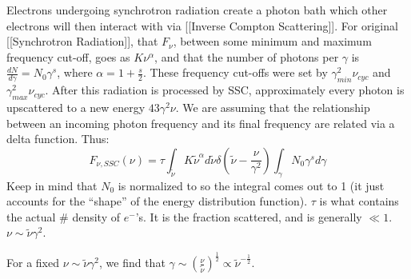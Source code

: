 \documentclass{article}
\def\hf{\frac12}
\def\hf{\frac12}
\def\tn{{\tilde\nu}}
\begin{document}
Electrons undergoing synchrotron radiation create a photon bath which
other electrons will then interact with via [[Inverse Compton Scattering]].  For original [[Synchrotron Radiation]], that $F_\nu$, between
some minimum and maximum frequency cut-off, goes as $K\nu^\alpha$, and that
the number of photons per $\gamma$ is $\frac{dN}{ d\gamma}=N_0\gamma^s$, where
$\alpha={1+\frac{s}{2}}$.  These frequency cut-offs were set by $\gamma_{min}^2
\nu_{cyc}$ and $\gamma_{max}^2\nu_{cyc}$.  After this radiation is processed
by SSC, approximately every photon is upscattered to a new energy
${4}{3}\gamma^2\nu$.  We are assuming that the relationship between
an incoming photon frequency and its final frequency are related via a
delta function.  Thus:
\def\tn{{\tilde\nu}}
$$F_{\nu,SSC}(\nu)=\tau\int_{\tn}{K\tn^\alpha d\tn\delta\left(\tn-
\frac{\nu}{\gamma^2}\right)\int_\gamma{N_0\gamma^sd\gamma}}$$
Keep in mind that $N_0$ is normalized to so the integral comes out to 1
(it just accounts for the 
``shape'' of the energy distribution function). $\tau$ is what contains the actual
\# density of $e^-$'s.  It is the fraction scattered,
and is generally $\ll1$. $\nu\sim\tn\gamma^2$.\par
For a fixed $\nu\sim\tn\gamma^2$, we find that $\gamma\sim\left(\frac{\nu}{
\tn}\right)^\hf\propto\tn^{-\hf}$.
\end{document}
